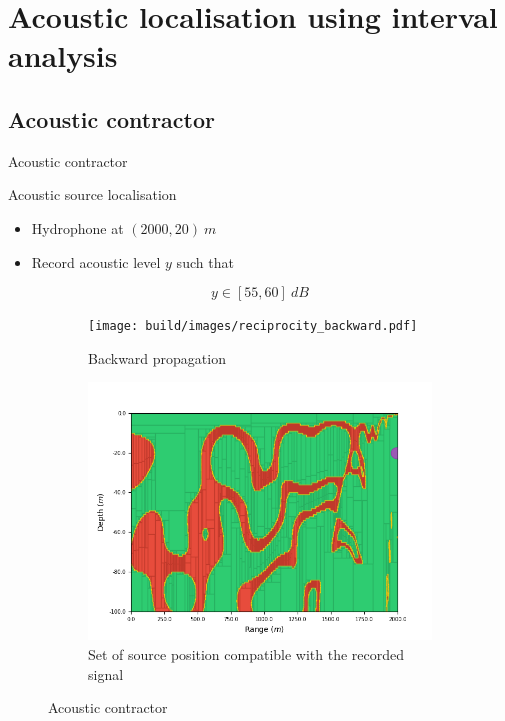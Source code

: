 \documentclass[9pt, xcolor={usenames, dvipsnames}]{beamer}
\begin{document}
		\section{Acoustic localisation using interval analysis}

			\subsection{Acoustic contractor}

			\begin{frame}{Acoustic contractor}
				\centering
				\begin{minipage}{0.5\textwidth}
					\begin{exampleblock}{Acoustic source localisation}
						\begin{itemize}
							\item Hydrophone at $(2000, 20)\ m$
							\item Record acoustic level $y$ such that
						\end{itemize}
						\begin{equation}
							y \in [55, 60]\ dB
						\end{equation}
					\end{exampleblock}
				\end{minipage}
				\hfill
				\begin{minipage}{0.36\textwidth}
					\begin{figure}[!htb]
						\begin{subfigure}[!htb]{\textwidth}
							\texttt{[image: build/images/reciprocity\_backward.pdf]}
							\caption{Backward propagation}
						\end{subfigure}
						\begin{subfigure}[!htb]{\textwidth}
							\includegraphics[width=\textwidth]{images/localisation/Hydrophone_20_2000.png}
							\caption{Set of source position compatible with the recorded signal}
						\end{subfigure}
						\caption{Acoustic contractor}
					\end{figure}
				\end{minipage}
			\end{frame}
			
\end{document}
